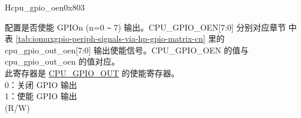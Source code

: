 \begin{register}{H}{cpu\_gpio\_oen}{0x803}\label{regdesc:GPIO_OEN}
%
%
%
%
%
%
%
%
%
\regnewline%
\begin{regdesc}\begin{reglist}
\label{fielddesc:GPIO_OEN}\item [CPU\_GPIO\_OEN] 配置是否使能 GPIOn (n=0 \verb+~+ 7) 输出。CPU\_GPIO\_OEN[7:0] 分别对应章节 \textit{} 中表 \ref{tab:iomuxgpio-periph-signals-via-hp-gpio-matrix-cn} 里的 cpu\_gpio\_out\_oen[7:0] 输出使能信号。CPU\_GPIO\_OEN 的值与 cpu\_gpio\_out\_oen 的值对应。\\
此寄存器是 \hyperref[fielddesc:GPIO_OUT]{CPU\_GPIO\_OUT} 的使能寄存器。\\
0：关闭 GPIO 输出\\
1：使能 GPIO 输出\\
(R/W)
\end{reglist}\end{regdesc}
\end{register}

